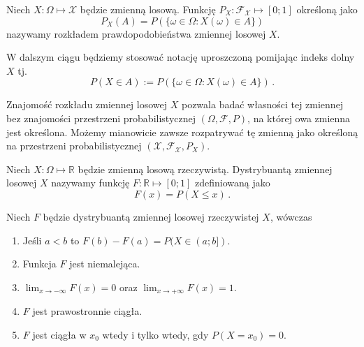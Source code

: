 \documentclass{myclass}
\numberwithin{equation}{section}
\begin{document}
\begin{definition}
Niech \(X: \Omega \mapsto \mathcal{X}\) będzie zmienną losową. Funkcję \(P_X:
\mathcal{F}_\mathcal{X}\mapsto [0;1]\) określoną jako
\begin{equation*}
    P_X(A) = P(\{\omega \in \Omega : X(\omega) \in A\})
\end{equation*}
nazywamy rozkładem prawdopodobieństwa zmiennej losowej \(X\).
\end{definition}

W dalszym ciągu będziemy stosować notację uproszczoną pomijając indeks dolny \(X\) tj.
\begin{equation*}
    P(X \in A) := P(\{\omega \in \Omega : X(\omega) \in A\})\,.
\end{equation*}

Znajomość rozkładu zmiennej losowej \(X\) pozwala badać własności tej zmiennej bez znajomości
przestrzeni probabilistycznej \((\Omega, \mathcal{F}, P)\), na której owa zmienna jest określona.
Możemy mianowicie zawsze rozpatrywać tę zmienną jako określoną na przestrzeni probabilistycznej
\((\mathcal{X}, \mathcal{F}_\mathcal{X}, P_X)\).

\begin{definition}
Niech \(X: \Omega \mapsto \mathbb{R}\) będzie zmienną losową rzeczywistą. Dystrybuantą zmiennej
losowej \(X\) nazywamy funkcję \(F: \mathbb{R} \mapsto [0;1]\) zdefiniowaną jako
\begin{equation*}
    F(x) = P(X \leq x)\,.
\end{equation*}
\end{definition}

\begin{theorem}
Niech \(F\) będzie dystrybuantą zmiennej losowej rzeczywistej \(X\), wówczas
\begin{enumerate}
    
    \item Jeśli \(a < b\) to \(F(b) - F(a) = P(X \in (a;b] )\).
    
    \item Funkcja \(F\) jest niemalejąca.

    \item \(\lim_{x \to -\infty} F(x) = 0\) oraz \(\lim_{x \to +\infty} F(x) = 1\).

    \item \(F\) jest prawostronnie ciągła.

    \item \(F\) jest ciągła w \(x_0\) wtedy i tylko wtedy, gdy \(P(X = x_0) = 0\).

\end{enumerate}
\end{theorem}
\end{document}
